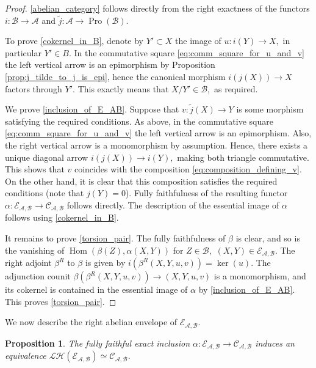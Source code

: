 \documentclass[11pt,leqno]{amsart}
\newtheorem{prop}[theo]{Proposition}
\numberwithin{equation}{section}
\def\wt{\widetilde}
\def\Hom{\operatorname{Hom}}
\newcommand{\cL}{{\mathcal L}}
\newcommand{\cA}{{\mathcal A}}
\newcommand{\cB}{{\mathcal B}}
\newcommand{\cC}{{\mathcal C}}
\newcommand{\cE}{{\mathcal E}}
\newcommand{\cH}{{\mathcal H}}
\newcommand{\Pro}{\operatorname{Pro}}
\begin{document}
\begin{proof} \ref{abelian_category} follows directly from the right exactness of the functors $i:\cB\to\cA$ and $\wt{j}:\cA\to\Pro(\cB).$

To prove \ref{cokernel_in_B}, denote by $Y'\subset X$ the image of $u:i(Y)\to X,$ in particular $Y'\in B.$ In the commutative square \eqref{eq:comm_square_for_u_and_v} the left vertical arrow is an epimorphism by Proposition \ref{prop:j_tilde_to_j_is_epi}, hence the canonical morphism $i(j(X))\to X$ factors through $Y'.$ This exactly means that $X/Y'\in\cB,$ as required. 

We prove \ref{inclusion_of_E_AB}. Suppose that $v:\wt{j}(X)\to Y$ is some morphism satisfying the required conditions. As above, in the commutative square \eqref{eq:comm_square_for_u_and_v} the left vertical arrow is an epimorphism. Also, the right vertical arrow is a monomorphism by assumption. Hence, there exists a unique diagonal arrow $i(j(X))\to i(Y),$ making both triangle commutative. This shows that $v$ coincides with the composition \eqref{eq:composition_defining_v}. On the other hand, it is clear that this composition satisfies the required conditions (note that $j(Y)=0$). Fully faithfulness of the resulting functor $\alpha:\cE_{\cA,\cB}\to \cC_{\cA,\cB}$ follows directly. The description of the essential image of $\alpha$ follows using \ref{cokernel_in_B}.

It remains to prove \ref{torsion_pair}. The fully faithfulness of $\beta$ is clear, and so is the vanishing of $\Hom(\beta(Z),\alpha(X,Y))$ for $Z\in\cB,$ $(X,Y)\in\cE_{\cA,\cB}.$ The right adjoint $\beta^R$ to $\beta$ is given by $i(\beta^R(X,Y,u,v))=\ker(u).$ The adjunction counit  $\beta(\beta^R(X,Y,u,v))\to (X,Y,u,v)$ is a monomorphism, and its cokernel is contained in the essential image of $\alpha$ by \ref{inclusion_of_E_AB}. This proves \ref{torsion_pair}.
\end{proof}

We now describe the right abelian envelope of $\cE_{\cA,\cB}.$

\begin{prop}\label{prop:abelian_envelope}
The fully faithful exact inclusion $\alpha:\cE_{\cA,\cB}\to \cC_{\cA,\cB}$ induces an equivalence $\cL\cH(\cE_{\cA,\cB})\simeq \cC_{\cA,\cB}.$ 
\end{prop}
\end{document}
